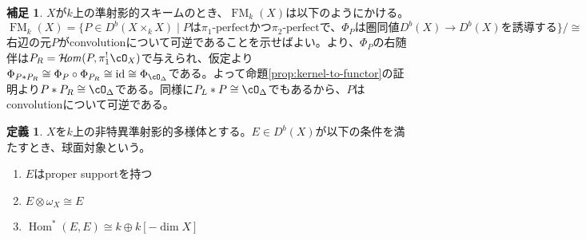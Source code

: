 \documentclass[uplatex, a4paper, dvipdfmx]{jsarticle}
\theoremstyle{definition}
\newtheorem{definition}[theorem]{定義}
\newtheorem{remark}[theorem]{補足}
\DeclareMathOperator{\Hom}{\mathrm{Hom}}
\DeclareMathOperator{\CHom}{\mathcal{H}\!\mathit{om}}
\DeclareMathOperator{\id}{\mathrm{id}}
\DeclareMathOperator{\FM}{\mathrm{FM}}
\begin{document}
\begin{remark}
    $X$が$k$上の準射影的スキームのとき、$\FM_k(X)$は以下のようにかける。
    \begin{equation}
        \FM_k(X) = \{P \in D^b(X \times_k X) \mid P \text{は$\pi_1$-perfectかつ$\pi_2$-perfectで、$\Phi_P$は圏同値$D^b(X) \to D^b(X)$を誘導する}\}/\cong
    \end{equation}
    右辺の元$P$がconvolutionについて可逆であることを示せばよい。\cite{MR3720794}より、$\Phi_P$の右随伴は$P_R = \CHom(P, \pi_1^!\cO_X)$で与えられ、仮定より$\Phi_{P * P_R} \cong \Phi_P \circ \Phi_{P_R} \cong \id \cong \Phi_{\cO_{\Delta}}$である。よって命題\ref{prop:kernel-to-functor}の証明より$P * P_R \cong \cO_{\Delta}$である。同様に$P_L * P \cong \cO_{\Delta}$でもあるから、$P$はconvolutionについて可逆である。
\end{remark}
\begin{definition}
    $X$を$k$上の非特異準射影的多様体とする。$E \in D^b(X)$が以下の条件を満たすとき、球面対象という。
    \begin{enumerate}
        \item $E$はproper supportを持つ
        \item $E \otimes \omega_X \cong E$
        \item $\Hom^*(E, E) \cong k \oplus k[-\dim X]$
    \end{enumerate}
\end{definition}
\end{document}
